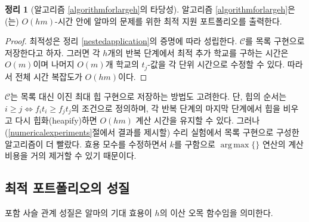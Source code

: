 \documentclass[11pt]{article} %
\DeclareMathOperator*{\argmax}{arg\,max}
\newif\ifen
\newtheorem{theorem}{Theorem}
\theoremstyle{definition}
\newtheorem{theorem}{정리}
\theoremstyle{definition}
\begin{document}
\begin{theorem}[\ifen Validity of Algorithm \ref{algorithmforlargeh}\else 알고리즘 \ref{algorithmforlargeh}의 타당성\fi] \label{validityofalmaalgorithm}
\ifen Algorithm \ref{algorithmforlargeh} produces an optimal application portfolio for Alma's problem in $O(h m)$-time.
\else 알고리즘 \ref{algorithmforlargeh}은(는) $O(h m)$-시간 안에 알마의 문제를 위한 최적 지원 포트폴리오를 출력한다.\fi
\end{theorem}
\begin{proof}
\ifen
Optimality follows from the proof of Theorem \ref{nestedapplication}. Suppose $\mathcal{C}$ is stored as a list. Then at each of the $h$ iterations of the main loop, finding the top school costs $O(m)$, and the $t_j$-values of the remaining $O(m)$ schools are each updated in unit time. Therefore, the overall time complexity is $O(h m)$.
\else
최적성은 정리 \ref{nestedapplication}의 증명에 따라 성립한다. $\mathcal{C}$를 목록 구현으로 저장한다고 하자. 그러면 각 $h$개의 반복 단계에서 최적 추가 학교를 구하는 시간은 $O(m)$이며 나머지 $O(m)$개 학교의 $t_j$-값을 각 단위 시간으로 수정할 수 있다. 따라서 전체 시간 복잡도가 $O(h m)$이다.
\fi
\end{proof}

\ifen 
It is possible to store $\mathcal{C}$ as a binary max heap rather than a list. The heap is ordered according to the criterion $i \geq j \iff f_i t_i \geq f_j t_j$, and by draining the heap and reheapifying at the end of each iteration, the computation time remains $O(hm)$. However, in our numerical experiments, whose results are reported in Section \ref{numericalexperiments},
we found the list implementation to be much faster, because it is possible to identify the entering school $k$ as the utility parameters are updated, which all but eliminates the cost of the $\argmax\{\}$ operation. 
\else
$\mathcal{C}$는 목록 대신 이진 최대 힙 구현으로 저장하는 방법도 고려한다. 단, 힙의 순서는 $i \geq j \iff f_i t_i \geq f_j t_j$의 조건으로 정의하며, 각 반복 단계의 마지막 단계에서 힙을 비우고 다시 힙화(heapify)하면 $O(hm)$ 계산 시간을 유지할 수 있다. 그러나 (\ref{numericalexperiments}절에서 결과를 제시할) 수리 실험에서 목록 구현으로 구성한 알고리즘이 더 빨랐다. 효용 모수를 수정하면서 $k$를 구함으로 $\argmax\{\}$ 연산의 계산 비용을 거의 제거할 수 있기 때문이다.
\fi


\ifen \subsection{Properties of the optimal portfolios} \else\subsection{최적 포트폴리오의 성질} \fi
\ifen The nestedness property implies that Alma's expected utility is a discretely concave function of $h$.
\else 포함 사슬 관계 성질은 알마의 기대 효용이 $h$의 이산 오목 함수임을 의미한다.\fi
\end{document}
